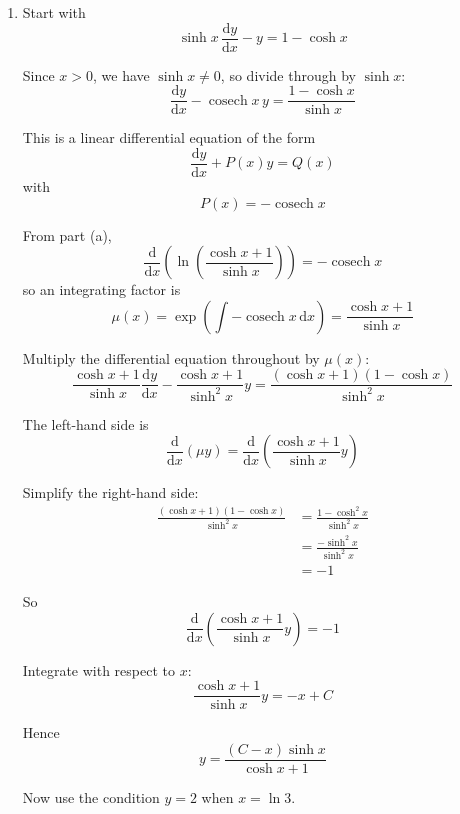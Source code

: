 \documentclass[leqno]{article}
\begin{document}
\begin{enumerate}[
  label=\textbf{\arabic*.},
  leftmargin=*,
  topsep=0pt,
  partopsep=0pt,
  parsep=0pt
]
\begin{tcolorbox}[colback=white, colframe=scarlet, title={\textbf{Solution}}, breakable, grow to left by=6mm, grow to right by=10mm]
\begin{enumerate}[label=\textbf{(\alph*)}]
So
\begin{align*}
\frac{\mathrm{d}}{\mathrm{d}x}\left(\ln\left(\frac{\cosh x+1}{\sinh x}\right)\right)
&=\frac{-(\cosh x+1)}{\sinh x(\cosh x+1)} \\
&=-\frac{1}{\sinh x} \\
&=-\operatorname{cosech}x
\end{align*}

Hence,
\[
\frac{\mathrm{d}}{\mathrm{d}x}\left(\ln\left(\frac{\cosh x+1}{\sinh x}\right)\right)=-\operatorname{cosech}x
\]

  \item Start with
\[
\sinh x\,\frac{\mathrm{d}y}{\mathrm{d}x}-y=1-\cosh x
\]

Since $x>0$, we have $\sinh x\neq 0$, so divide through by $\sinh x$:
\[
\frac{\mathrm{d}y}{\mathrm{d}x}-\operatorname{cosech}x\,y=\frac{1-\cosh x}{\sinh x}
\]

This is a linear differential equation of the form
\[
\frac{\mathrm{d}y}{\mathrm{d}x}+P(x)y=Q(x)
\]
with
\[
P(x)=-\operatorname{cosech}x
\]

From part (a),
\[
\frac{\mathrm{d}}{\mathrm{d}x}\left(\ln\left(\frac{\cosh x+1}{\sinh x}\right)\right)=-\operatorname{cosech}x
\]
so an integrating factor is
\[
\mu(x)=\exp\left(\int -\operatorname{cosech}x\,\mathrm{d}x\right)=\frac{\cosh x+1}{\sinh x}
\]

Multiply the differential equation throughout by $\mu(x)$:
\[
\frac{\cosh x+1}{\sinh x}\frac{\mathrm{d}y}{\mathrm{d}x}-\frac{\cosh x+1}{\sinh^2 x}y
=\frac{(\cosh x+1)(1-\cosh x)}{\sinh^2 x}
\]

The left-hand side is
\[
\frac{\mathrm{d}}{\mathrm{d}x}\left(\mu y\right)
=\frac{\mathrm{d}}{\mathrm{d}x}\left(\frac{\cosh x+1}{\sinh x}y\right)
\]

Simplify the right-hand side:
\begin{align*}
\frac{(\cosh x+1)(1-\cosh x)}{\sinh^2 x}
&=\frac{1-\cosh^2 x}{\sinh^2 x} \\
&=\frac{-\sinh^2 x}{\sinh^2 x} \\
&=-1
\end{align*}

So
\[
\frac{\mathrm{d}}{\mathrm{d}x}\left(\frac{\cosh x+1}{\sinh x}y\right)=-1
\]

Integrate with respect to $x$:
\[
\frac{\cosh x+1}{\sinh x}y=-x+C
\]

Hence
\[
y=\frac{(C-x)\sinh x}{\cosh x+1}
\]

Now use the condition $y=2$ when $x=\ln 3$.


\end{enumerate}
\end{tcolorbox}
\end{enumerate}
\end{document}
